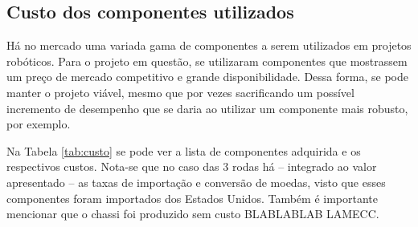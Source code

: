 \subsection{Custo dos componentes utilizados}
\label{sec:custo}

Há no mercado uma variada gama de componentes a serem utilizados em projetos robóticos. Para o projeto em questão, se utilizaram componentes que mostrassem um preço de mercado competitivo e grande disponibilidade. Dessa forma, se pode manter o projeto viável, mesmo que por vezes sacrificando um possível incremento de desempenho que se daria ao utilizar um componente mais robusto, por exemplo.

Na Tabela \ref{tab:custo} se pode ver a lista de componentes adquirida e os respectivos custos. Nota-se que no caso das 3 rodas há -- integrado ao valor apresentado -- as taxas de importação e conversão de moedas, visto que esses componentes foram importados dos Estados Unidos. Também é importante mencionar que o chassi foi produzido sem custo BLABLABLAB LAMECC.

